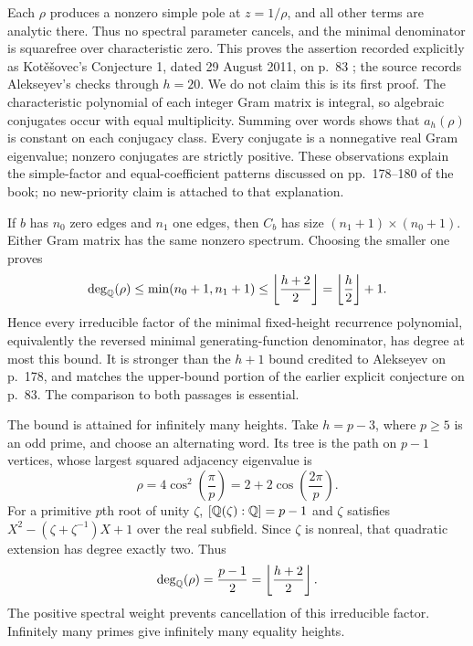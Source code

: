 \documentclass[11pt,letterpaper]{article}
\numberwithin{equation}{section}
\theoremstyle{remark}\newtheorem{remark}[theorem]{Remark}
\begin{document}
Each $\rho$ produces a nonzero simple pole at $z=1/\rho$, and all other terms are analytic there. Thus no spectral parameter cancels, and the minimal denominator is squarefree over characteristic zero. This proves the assertion recorded explicitly as Kot\v{e}\v{s}ovec's Conjecture 1, dated 29 August 2011, on p.~83 \cite{kotesovec}; the source records Alekseyev's checks through $h=20$. We do not claim this is its first proof. The characteristic polynomial of each integer Gram matrix is integral, so algebraic conjugates occur with equal multiplicity. Summing over words shows that $a_h(\rho)$ is constant on each conjugacy class. Every conjugate is a nonnegative real Gram eigenvalue; nonzero conjugates are strictly positive. These observations explain the simple-factor and equal-coefficient patterns discussed on pp.~178--180 of the book; no new-priority claim is attached to that explanation.

If $b$ has $n_0$ zero edges and $n_1$ one edges, then $C_b$ has size $(n_1+1)\times(n_0+1)$. Either Gram matrix has the same nonzero spectrum. Choosing the smaller one proves
\begin{equation}\label{mdk:asp:eq:degree}
\deg_{\mathbb Q}(\rho)\le\min(n_0+1,n_1+1)\le\left\lfloor\frac{h+2}{2}\right\rfloor
=\left\lfloor\frac h2\right\rfloor+1.
\end{equation}
Hence every irreducible factor of the minimal fixed-height recurrence polynomial, equivalently the reversed minimal generating-function denominator, has degree at most this bound. It is stronger than the $h+1$ bound credited to Alekseyev on p.~178, and matches the upper-bound portion of the earlier explicit conjecture on p.~83. The comparison to both passages is essential.

The bound is attained for infinitely many heights. Take $h=p-3$, where $p\ge5$ is an odd prime, and choose an alternating word. Its tree is the path on $p-1$ vertices, whose largest squared adjacency eigenvalue is
\[
\rho=4\cos^2\left(\frac\pi p\right)=2+2\cos\left(\frac{2\pi}p\right).
\]
For a primitive $p$th root of unity $\zeta$, $[\mathbb Q(\zeta):\mathbb Q]=p-1$ and $\zeta$ satisfies $X^2-(\zeta+\zeta^{-1})X+1$ over the real subfield. Since $\zeta$ is nonreal, that quadratic extension has degree exactly two. Thus
\[
\deg_{\mathbb Q}(\rho)=\frac{p-1}{2}=\left\lfloor\frac{h+2}{2}\right\rfloor.
\]
The positive spectral weight prevents cancellation of this irreducible factor. Infinitely many primes give infinitely many equality heights.
\end{document}
